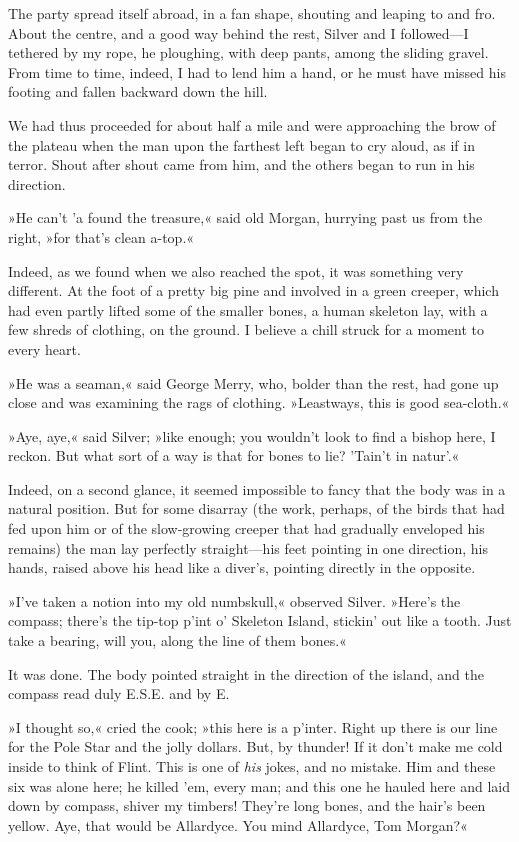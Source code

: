 The party spread itself abroad, in a fan shape, shouting and leaping to and fro. About the centre, and a good way behind the rest, Silver and I followed—I tethered by my rope, he ploughing, with deep pants, among the sliding gravel. From time to time, indeed, I had to lend him a hand, or he must have missed his footing and fallen backward down the hill.

We had thus proceeded for about half a mile and were approaching the brow of the plateau when the man upon the farthest left began to cry aloud, as if in terror. Shout after shout came from him, and the others began to run in his direction.

»He can't 'a found the treasure,« said old Morgan, hurrying past us from the right, »for that's clean a-top.«

Indeed, as we found when we also reached the spot, it was something very different. At the foot of a pretty big pine and involved in a green creeper, which had even partly lifted some of the smaller bones, a human skeleton lay, with a few shreds of clothing, on the ground. I believe a chill struck for a moment to every heart.

»He was a seaman,« said George Merry, who, bolder than the rest, had gone up close and was examining the rags of clothing. »Leastways, this is good sea-cloth.«

»Aye, aye,« said Silver; »like enough; you wouldn't look to find a bishop here, I reckon. But what sort of a way is that for bones to lie? 'Tain't in natur'.«

Indeed, on a second glance, it seemed impossible to fancy that the body was in a natural position. But for some disarray (the work, perhaps, of the birds that had fed upon him or of the slow-growing creeper that had gradually enveloped his remains) the man lay perfectly straight—his feet pointing in one direction, his hands, raised above his head like a diver's, pointing directly in the opposite.

»I've taken a notion into my old numbskull,« observed Silver. »Here's the compass; there's the tip-top p'int o' Skeleton Island, stickin' out like a tooth. Just take a bearing, will you, along the line of them bones.«

It was done. The body pointed straight in the direction of the island, and the compass read duly E.S.E. and by E.

»I thought so,« cried the cook; »this here is a p'inter. Right up there is our line for the Pole Star and the jolly dollars. But, by thunder! If it don't make me cold inside to think of Flint. This is one of \textit{his} jokes, and no mistake. Him and these six was alone here; he killed 'em, every man; and this one he hauled here and laid down by compass, shiver my timbers! They're long bones, and the hair's been yellow. Aye, that would be Allardyce. You mind Allardyce, Tom Morgan?«

